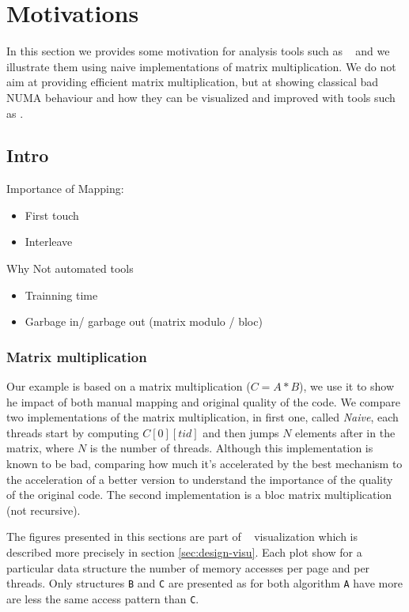 \section{Motivations}
\label{sec:motivations}

In this section we provides some motivation for analysis tools such as
\TABARNAC~ and we illustrate them using naive implementations of matrix
multiplication. We do not aim at providing efficient matrix multiplication,
but at showing classical bad NUMA behaviour and how they can be visualized and
improved with tools such as \TABARNAC.

\subsection{Intro}
\label{sec:motivations-intro}

Importance of Mapping:
\begin{itemize}
    \item First touch
    \item Interleave
\end{itemize}

Why Not automated tools
\begin{itemize}
    \item Trainning time
    \item Garbage in/ garbage out (matrix modulo / bloc)
\end{itemize}

\subsubsection{Matrix multiplication}

Our example is based on a matrix multiplication ($C=A*B$), we use it to show
he impact of both manual mapping and original quality of the code. We compare
two implementations of the matrix multiplication, in first one, called
\emph{Naive}, each threads start by computing $C[0][tid]$ and then jumps $N$
elements after in the matrix, where $N$ is the number of threads. Although
this implementation is known to be bad, comparing how much it's accelerated by
the best mechanism to the acceleration of a better version to understand the
importance of the quality of the original code.  The
second implementation is a bloc matrix multiplication (not recursive).

The figures presented in this sections are part of \TABARNAC~ visualization
which is described more precisely in section \ref{sec:design-visu}. Each plot
show for a particular data structure the number of memory accesses per page
and per threads. Only structures \texttt{B} and \texttt{C} are presented as
for both algorithm \texttt{A} have more are less the same access pattern than
\texttt{C}.

